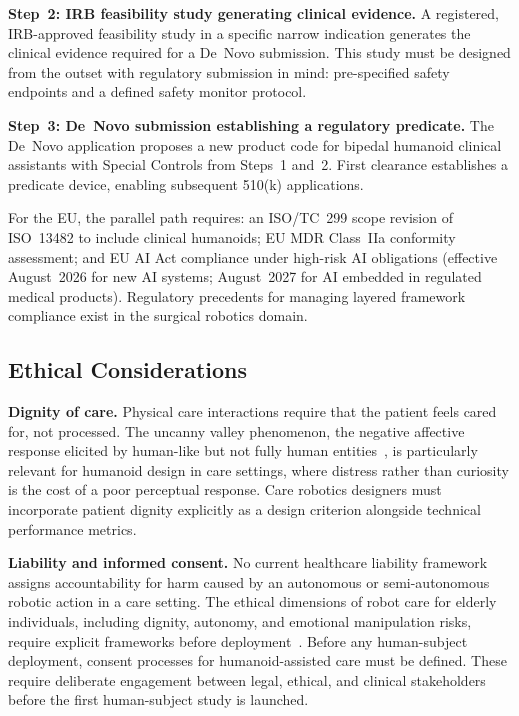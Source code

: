 \textbf{Step~2: IRB feasibility study generating clinical evidence.} A registered,
IRB-approved feasibility study in a specific narrow indication generates the
clinical evidence required for a De~Novo submission. This study must be designed
from the outset with regulatory submission in mind: pre-specified safety endpoints
and a defined safety monitor protocol.

\textbf{Step~3: De~Novo submission establishing a regulatory predicate.} The
De~Novo application proposes a new product code for bipedal humanoid clinical
assistants with Special Controls from Steps~1 and~2. First clearance establishes
a predicate device, enabling subsequent 510(k) applications.

For the EU, the parallel path requires: an ISO/TC~299 scope revision of
ISO~13482 to include clinical humanoids; EU MDR Class~IIa conformity assessment;
and EU AI Act compliance under high-risk AI obligations (effective August~2026 for
new AI systems; August~2027 for AI embedded in regulated medical products).
Regulatory precedents for managing layered framework compliance exist in the
surgical robotics domain.

\subsection{Ethical Considerations}
\label{sec:ethics}

\textbf{Dignity of care.} Physical care interactions require that the patient
feels cared for, not processed. The uncanny valley phenomenon, the
negative affective response elicited by human-like but not fully human
entities~\cite{mori2012uncanny}, is particularly relevant for humanoid design in
care settings, where distress rather than curiosity is the cost of a poor
perceptual response. Care robotics designers must incorporate patient dignity
explicitly as a design criterion alongside technical performance metrics.

\textbf{Liability and informed consent.} No current healthcare liability
framework assigns accountability for harm caused by an autonomous or
semi-autonomous robotic action in a care setting. The ethical dimensions of robot
care for elderly individuals, including dignity, autonomy, and emotional
manipulation risks, require explicit frameworks before
deployment~\cite{sharkey2012granny}. Before any human-subject deployment, consent
processes for humanoid-assisted care must be defined. These require deliberate
engagement between legal, ethical, and clinical stakeholders before the first
human-subject study is launched.


